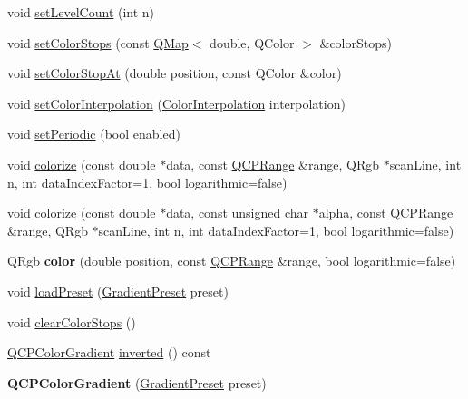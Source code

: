 \begin{DoxyCompactItemize}
\item 
void \hyperlink{class_q_c_p_color_gradient_a18da587eb4f7fc788ea28ba15b6a12de}{set\+Level\+Count} (int n)
\item 
void \hyperlink{class_q_c_p_color_gradient_a724e828aa6f0ba5011a9392477c35d3a}{set\+Color\+Stops} (const \hyperlink{class_q_map}{Q\+Map}$<$ double, Q\+Color $>$ \&color\+Stops)
\item 
void \hyperlink{class_q_c_p_color_gradient_a3b48be5e78079db1bb2a1188a4c3390e}{set\+Color\+Stop\+At} (double position, const Q\+Color \&color)
\item 
void \hyperlink{class_q_c_p_color_gradient_aa13fda86406e1d896a465a409ae63b38}{set\+Color\+Interpolation} (\hyperlink{class_q_c_p_color_gradient_ac5dca17cc24336e6ca176610e7f77fc1}{Color\+Interpolation} interpolation)
\item 
void \hyperlink{class_q_c_p_color_gradient_a39d6448155fc00a219f239220d14bb39}{set\+Periodic} (bool enabled)
\item 
void \hyperlink{class_q_c_p_color_gradient_aaf423ceb943e177b0ed2c48c811d83dc}{colorize} (const double $\ast$data, const \hyperlink{class_q_c_p_range}{Q\+C\+P\+Range} \&range, Q\+Rgb $\ast$scan\+Line, int n, int data\+Index\+Factor=1, bool logarithmic=false)
\item 
void \hyperlink{class_q_c_p_color_gradient_acf0cc7fba83ef21f7b8d5d5258519db3}{colorize} (const double $\ast$data, const unsigned char $\ast$alpha, const \hyperlink{class_q_c_p_range}{Q\+C\+P\+Range} \&range, Q\+Rgb $\ast$scan\+Line, int n, int data\+Index\+Factor=1, bool logarithmic=false)
\item 
Q\+Rgb {\bfseries color} (double position, const \hyperlink{class_q_c_p_range}{Q\+C\+P\+Range} \&range, bool logarithmic=false)\hypertarget{class_q_c_p_color_gradient_a0599545c859268b025d2060dea741cea}{}\label{class_q_c_p_color_gradient_a0599545c859268b025d2060dea741cea}

\item 
void \hyperlink{class_q_c_p_color_gradient_aa0aeec1528241728b9671bf8e60b1622}{load\+Preset} (\hyperlink{class_q_c_p_color_gradient_aed6569828fee337023670272910c9072}{Gradient\+Preset} preset)
\item 
void \hyperlink{class_q_c_p_color_gradient_a939213e85f0d1279519d555c5fcfb6ad}{clear\+Color\+Stops} ()
\item 
\hyperlink{class_q_c_p_color_gradient}{Q\+C\+P\+Color\+Gradient} \hyperlink{class_q_c_p_color_gradient_abe04e1d1ccab3d7aa78f2924faed4916}{inverted} () const 
\item 
{\bfseries Q\+C\+P\+Color\+Gradient} (\hyperlink{class_q_c_p_color_gradient_aed6569828fee337023670272910c9072}{Gradient\+Preset} preset)\hypertarget{class_q_c_p_color_gradient_a4e570b4004fd60bd135e52d685ed2b66}{}\label{class_q_c_p_color_gradient_a4e570b4004fd60bd135e52d685ed2b66}


\end{DoxyCompactItemize}
